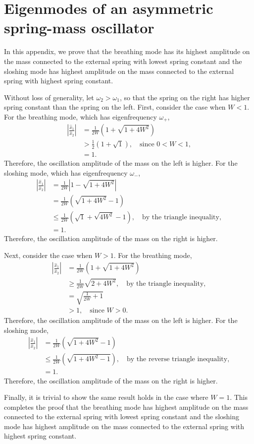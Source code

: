 \chapter{Eigenmodes of an asymmetric spring-mass oscillator} \label{app: coupled oscillator modes}
In this appendix, we prove that the breathing mode has its highest amplitude on the mass connected to the external spring with lowest spring constant and the sloshing mode has highest amplitude on the mass connected to the external spring with highest spring constant.

Without loss of generality, let $\omega_2 > \omega_1$, so that the spring on the right has higher spring constant than the spring on the left. First, consider the case when $W < 1$. For the breathing mode, which has eigenfrequency $\omega_+$,
\begin{align}
	\left| \frac{\hat{x}_1}{\hat{x}_2} \right| & = \frac{1}{2W} \left(1 + \sqrt{1 + 4W^2}\right) \\
	& >  \frac{1}{2} \left(1 + \sqrt{1}\right), \quad \text{since $0 < W < 1$,} \\
	& = 1.
\end{align}
Therefore, the oscillation amplitude of the mass on the left is higher. For the sloshing mode, which has eigenfrequency $\omega_-$,
\begin{align}
	\left| \frac{\hat{x}_1}{\hat{x}_2} \right| & = \frac{1}{2W} \left|1 - \sqrt{1 + 4W^2}\right| \\
	& = \frac{1}{2W} \left(\sqrt{1 + 4W^2} - 1\right) \\
	& \leq \frac{1}{2W} \left(\sqrt{1} + \sqrt{4W^2} - 1\right), \quad \text{by the triangle inequality,} \\
	& = 1.
\end{align}
Therefore, the oscillation amplitude of the mass on the right is higher.

Next, consider the case when $W > 1$. For the breathing mode,
\begin{align}
\left| \frac{\hat{x}_1}{\hat{x}_2} \right| & = \frac{1}{2W} \left(1 + \sqrt{1 + 4W^2}\right) \\
& \geq \frac{1}{2W} \sqrt{2 + 4W^2}, \quad \text{by the triangle inequality,} \\
& = \sqrt{\frac{1}{2W} + 1} \\
& > 1,  \quad \text{since $W > 0$.}
\end{align}
Therefore, the oscillation amplitude of the mass on the left is higher. For the sloshing mode,
\begin{align}
\left| \frac{\hat{x}_1}{\hat{x}_2} \right| & = \frac{1}{2W} \left(\sqrt{1 + 4W^2} - 1\right) \\
& \leq \frac{1}{2W} \left(\sqrt{1 + 4W^2 - 1}\right), \quad \text{by the reverse triangle inequality,} \\
& = 1.
\end{align}
Therefore, the oscillation amplitude of the mass on the right is higher.

Finally, it is trivial to show the same result holds in the case where $W = 1$. This completes the proof that the breathing mode has highest amplitude on the mass connected to the external spring with lowest spring constant and the sloshing mode has highest amplitude on the mass connected to the external spring with highest spring constant.